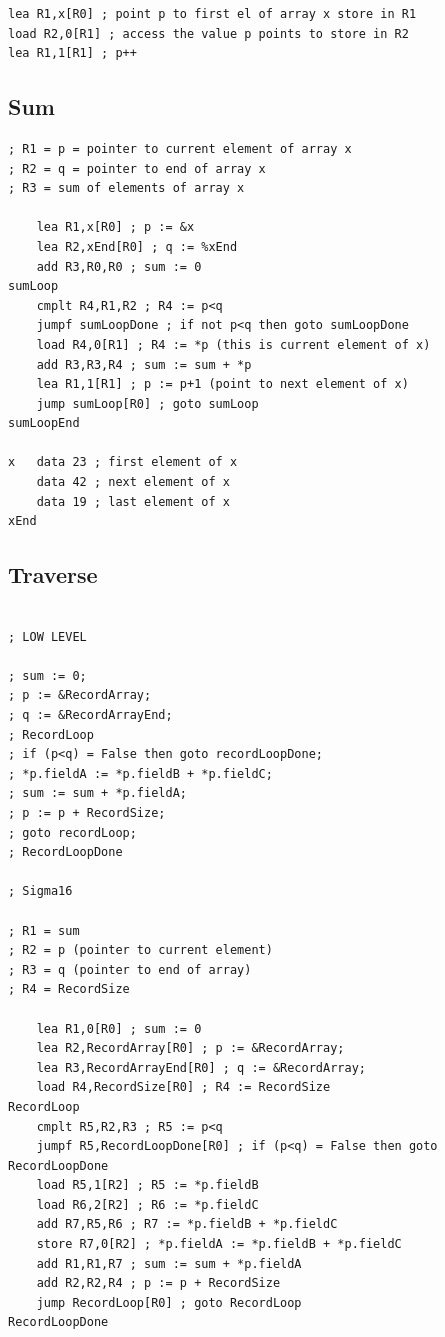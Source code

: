 \documentclass[english,course]{Notes}
\begin{document}
{\begin{lstlisting}
lea R1,x[R0] ; point p to first el of array x store in R1
load R2,0[R1] ; access the value p points to store in R2
lea R1,1[R1] ; p++
\end{lstlisting}


\subsection{Sum}

\begin{lstlisting}
; R1 = p = pointer to current element of array x
; R2 = q = pointer to end of array x
; R3 = sum of elements of array x

	lea R1,x[R0] ; p := &x
	lea R2,xEnd[R0] ; q := %xEnd
	add R3,R0,R0 ; sum := 0
sumLoop
	cmplt R4,R1,R2 ; R4 := p<q
	jumpf sumLoopDone ; if not p<q then goto sumLoopDone
	load R4,0[R1] ; R4 := *p (this is current element of x)
	add R3,R3,R4 ; sum := sum + *p
	lea R1,1[R1] ; p := p+1 (point to next element of x)
	jump sumLoop[R0] ; goto sumLoop
sumLoopEnd

x 	data 23 ; first element of x
	data 42 ; next element of x
	data 19 ; last element of x
xEnd
\end{lstlisting}


\subsection{Traverse}

\begin{lstlisting}

; LOW LEVEL

; sum := 0;
; p := &RecordArray;
; q := &RecordArrayEnd;
; RecordLoop
; if (p<q) = False then goto recordLoopDone;
; *p.fieldA := *p.fieldB + *p.fieldC;
; sum := sum + *p.fieldA;
; p := p + RecordSize;
; goto recordLoop;
; RecordLoopDone

; Sigma16

; R1 = sum
; R2 = p (pointer to current element)
; R3 = q (pointer to end of array)
; R4 = RecordSize

	lea R1,0[R0] ; sum := 0
	lea R2,RecordArray[R0] ; p := &RecordArray;
	lea R3,RecordArrayEnd[R0] ; q := &RecordArray;
	load R4,RecordSize[R0] ; R4 := RecordSize
RecordLoop
	cmplt R5,R2,R3 ; R5 := p<q
	jumpf R5,RecordLoopDone[R0] ; if (p<q) = False then goto RecordLoopDone
	load R5,1[R2] ; R5 := *p.fieldB
	load R6,2[R2] ; R6 := *p.fieldC
	add R7,R5,R6 ; R7 := *p.fieldB + *p.fieldC
	store R7,0[R2] ; *p.fieldA := *p.fieldB + *p.fieldC
	add R1,R1,R7 ; sum := sum + *p.fieldA
	add R2,R2,R4 ; p := p + RecordSize
	jump RecordLoop[R0] ; goto RecordLoop
RecordLoopDone
\end{lstlisting}

}
\end{document}
